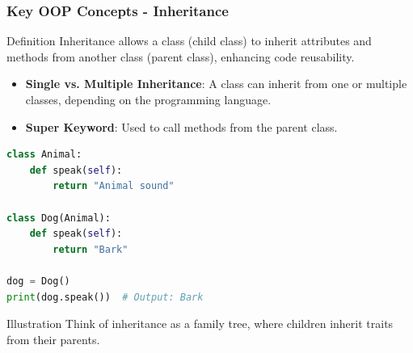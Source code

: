 \documentclass{beamer}
\begin{document}
\begin{frame}[fragile]
    \frametitle{Key OOP Concepts - Inheritance}
    \begin{block}{Definition}
        Inheritance allows a class (child class) to inherit attributes and methods from another class (parent class), enhancing code reusability.
    \end{block}

    \begin{itemize}
        \item \textbf{Single vs. Multiple Inheritance}: A class can inherit from one or multiple classes, depending on the programming language.
        \item \textbf{Super Keyword}: Used to call methods from the parent class.
    \end{itemize}

    \begin{lstlisting}[language=Python]
class Animal:
    def speak(self):
        return "Animal sound"

class Dog(Animal):
    def speak(self):
        return "Bark"

dog = Dog()
print(dog.speak())  # Output: Bark
    \end{lstlisting}
    
    \begin{block}{Illustration}
        Think of inheritance as a family tree, where children inherit traits from their parents.
    \end{block}
\end{frame}
\end{document}
